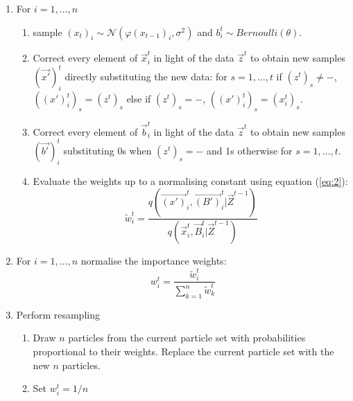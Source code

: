 \begin{algorithm}[H]
\begin{algorithmic}
\begin{enumerate}
	\item For $i = 1, \dots , n$
	\begin{enumerate}
  		\item sample $(x_t)_i \sim \mathcal{N} (\varphi (x_{t-1})_i, \sigma^{2})$ and $b^t_{i} \sim Bernoulli(\theta)$.
		\item {Correct every element of $\vec{x}^t_i$ in light of the data $\vec{z}^t$ to obtain new samples $(\vec{x'})^t_i$ directly substituting the new data: for $s = 1, \dots ,t$ if $(z^t)_s \neq -$, $((x')_i^t)_s = (z^t)_s$ else if $(z^t)_s = -$, $((x')_i^t)_s = (x^t_i)_s$.}
		\item Correct every element of $\vec{b}_i^t$ in light of the data $\vec{z}^t$ to obtain new samples $(\vec{b'})^t_i$ substituting 0s when $(z^t)_s = -$ and 1s otherwise for $s = 1, \dots, t$.
		\item Evaluate the weights up to a normalising constant using equation (\ref{eq:2}):
		\[
		\tilde{w}^{t}_{i} = \frac{q(\vec{(x')}^{t}_i, \vec{(B')}^{t}_i | \vec{Z}^{t-1})}{q(\vec{x}^{t}_i, \vec{B}^{t}_i | \vec{Z}^{t-1})}
		\]
	\end{enumerate}
	\item For $i = 1, \dots , n$ normalise the importance weights:
	\[
	w^{t}_{i} = \frac{\tilde{w}^t_i}{\sum_{k=1}^{n}\tilde{w}^{t}_k}
	\]
	\item Perform resampling
	\begin{enumerate}
	    \item Draw $n$ particles from the current particle set with probabilities proportional to their weights. Replace the current particle set with the new $n$ particles.
	    \item Set $w^t_i=1/n$
	\end{enumerate}
\end{enumerate}
  
 \end{algorithmic}
\end{algorithm}

